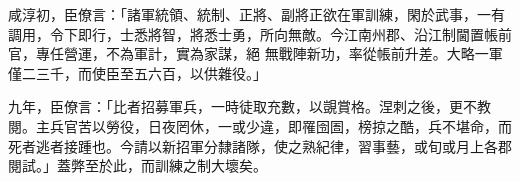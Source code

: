 \begin{pinyinscope}
 咸淳初，臣僚言：「諸軍統領、統制、正將、副將正欲在軍訓練，閑於武事，一有調用，令下即行，士悉將智，將悉士勇，所向無敵。今江南州郡、沿江制閫置帳前官，專任營運，不為軍計，實為家謀，絕
 無戰陣新功，率從帳前升差。大略一軍僅二三千，而使臣至五六百，以供雜役。」



 九年，臣僚言：「比者招募軍兵，一時徒取充數，以覬賞格。涅刺之後，更不教閱。主兵官苦以勞役，日夜罔休，一或少違，即罹囹圄，榜掠之酷，兵不堪命，而死者逃者接踵也。今請以新招軍分隸諸隊，使之熟紀律，習事藝，或旬或月上各郡閱試。」蓋弊至於此，而訓練之制大壞矣。



\end{pinyinscope}